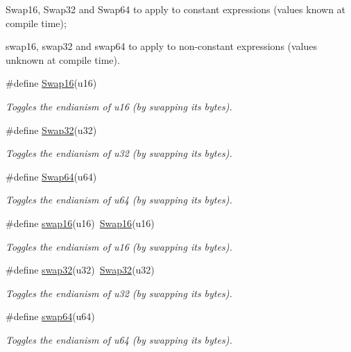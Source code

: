 \begin{DoxyItemize}
\item Swap16, Swap32 and Swap64 to apply to constant expressions (values known at compile time);
\item swap16, swap32 and swap64 to apply to non-\/constant expressions (values unknown at compile time). 
\end{DoxyItemize}\begin{DoxyCompactItemize}
\item 
\#define \hyperlink{group__group__sam0__utils_gadc9a009f53db3e7c3294ee6bc1027dca}{Swap16}(u16)
\begin{DoxyCompactList}\small\item\em Toggles the endianism of {\itshape u16} (by swapping its bytes). \end{DoxyCompactList}\item 
\#define \hyperlink{group__group__sam0__utils_ga5e9bc2e3b3e43eadc3210b02cab6ac64}{Swap32}(u32)
\begin{DoxyCompactList}\small\item\em Toggles the endianism of {\itshape u32} (by swapping its bytes). \end{DoxyCompactList}\item 
\#define \hyperlink{group__group__sam0__utils_ga33f3049d9b8374e8b93d5642bfe7f426}{Swap64}(u64)
\begin{DoxyCompactList}\small\item\em Toggles the endianism of {\itshape u64} (by swapping its bytes). \end{DoxyCompactList}\item 
\#define \hyperlink{group__group__sam0__utils_ga3067f71c33a89726a107430050253045}{swap16}(u16)~\hyperlink{group__group__sam0__utils_gadc9a009f53db3e7c3294ee6bc1027dca}{Swap16}(u16)
\begin{DoxyCompactList}\small\item\em Toggles the endianism of {\itshape u16} (by swapping its bytes). \end{DoxyCompactList}\item 
\#define \hyperlink{group__group__sam0__utils_ga46025d8a12ccc9f4268c84e56c457416}{swap32}(u32)~\hyperlink{group__group__sam0__utils_ga5e9bc2e3b3e43eadc3210b02cab6ac64}{Swap32}(u32)
\begin{DoxyCompactList}\small\item\em Toggles the endianism of {\itshape u32} (by swapping its bytes). \end{DoxyCompactList}\item 
\#define \hyperlink{group__group__sam0__utils_ga78484801bd5bea7d382b34a4ed1f345d}{swap64}(u64)
\begin{DoxyCompactList}\small\item\em Toggles the endianism of {\itshape u64} (by swapping its bytes). \end{DoxyCompactList}\end{DoxyCompactItemize}
